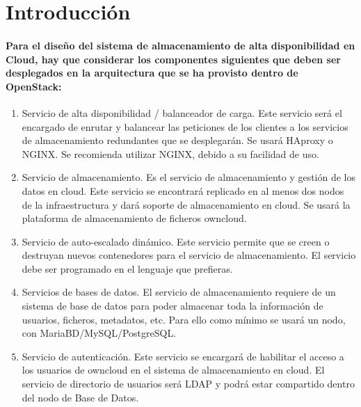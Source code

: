 \chapter{Introducción}

\subsubsection{Para	 el	 diseño	 del	 sistema	 de	 almacenamiento	 de	 alta	 disponibilidad	 en	 Cloud,	 hay	 que	
considerar	los	componentes	siguientes	que	deben	ser	desplegados en	la	arquitectura	que	
se	ha	provisto	dentro	de	OpenStack:}

\begin{enumerate}
\item
Servicio	 de	 alta	 disponibilidad / balanceador	 de	 carga.	 Este	 servicio	 será	 el	
encargado	 de	 enrutar y	 balancear	 las	 peticiones	 de	 los	 clientes	 a	 los	 servicios	 de	
almacenamiento	redundantes	que	se	desplegarán.	 Se	usará	HAproxy o	NGINX.	Se	
recomienda	utilizar	NGINX,	debido	a	su	facilidad	de	uso.
\item
Servicio	 de	 almacenamiento.	 Es	 el	 servicio	 de	 almacenamiento	 y	 gestión	 de	 los	
datos	en	 cloud.	Este	 servicio	 se	encontrará	 replicado	en	al	menos	dos	nodos	de	la	
infraestructura	y	dará	soporte	de	almacenamiento	en	cloud.	Se	usará	la	plataforma	
de	almacenamiento	de	ficheros	owncloud.

\item
Servicio	 de	 auto-escalado	 dinámico.	 Este	 servicio	 permite	 que	 se	 creen	 o	
destruyan	 nuevos	 contenedores	 para	 el	 servicio	 de	 almacenamiento.	 El	 servicio	
debe	ser	programado	en	el	lenguaje	que	prefieras.

\item
Servicios	de	bases	de	datos.	El	servicio	de	almacenamiento	requiere	de	un	sistema	
de	 base	 de	 datos	 para	 poder	 almacenar	 toda	la	información	 de	 usuarios,	 ficheros,	
metadatos,	 etc.	 Para	 ello	 como	 mínimo	 se	 usará	 un	 nodo,	 con	
MariaBD/MySQL/PostgreSQL.

\item
Servicio	 de	 autenticación.	 Este	 servicio	 se	 encargará	 de	 habilitar	 el	 acceso	 a	los	
usuarios	 de	 owncloud en	 el	 sistema	 de	 almacenamiento	 en	 cloud.	 El	 servicio	 de	
directorio	 de	 usuarios	 será	 LDAP y	 podrá	 estar	 compartido	 dentro	 del	 nodo	 de	
Base	de	Datos.

\end{enumerate}